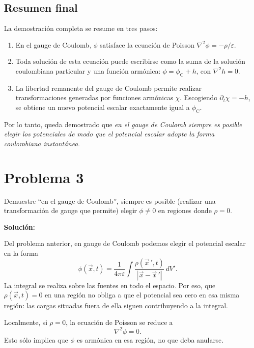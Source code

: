 \documentclass{article}
\numberwithin{equation}{section}
\newcommand{\eps}{\varepsilon}
\begin{document}
\subsection{Resumen final}

La demostración completa se resume en tres pasos:
\begin{enumerate}[leftmargin=1.5em]
    \item En el gauge de Coulomb, $\phi$ satisface la ecuación de Poisson $\nabla^2\phi=-\rho/\eps$.
    \item Toda solución de esta ecuación puede escribirse como la suma de la solución coulombiana particular y una función armónica: $\phi=\phi_{\mathrm C}+h$, con $\nabla^2h=0$.
    \item La libertad remanente del gauge de Coulomb permite realizar transformaciones generadas por funciones armónicas $\chi$. Escogiendo $\partial_t\chi=-h$, se obtiene un nuevo potencial escalar exactamente igual a $\phi_{\mathrm C}$.
\end{enumerate}

Por lo tanto, queda demostrado que \emph{en el gauge de Coulomb siempre es posible elegir los potenciales de modo que el potencial escalar adopte la forma coulombiana instantánea}.

\newpage
\section{Problema 3}
Demuestre ``en el gauge de Coulomb'', siempre es posible (realizar una transformación de gauge que permite) elegir $\phi\neq0$ en regiones donde $\rho=0$.

\textbf{Solución:}

Del problema anterior, en gauge de Coulomb podemos elegir el potencial escalar en la forma
\begin{equation}
\phi(\vec x,t)=\frac{1}{4\pi\varepsilon}
\int \frac{\rho(\vec x\,',t)}{|\vec x-\vec x\,'|}\,dV'.
\end{equation}
La integral se realiza sobre las fuentes en todo el espacio. Por eso, que $\rho(\vec x,t)=0$ en una región no obliga a que el potencial sea cero en esa misma región: las cargas situadas fuera de ella siguen contribuyendo a la integral.

Localmente, si $\rho=0$, la ecuación de Poisson se reduce a
\begin{equation}
    \nabla^2\phi=0.
\end{equation}
Esto sólo implica que $\phi$ es armónica en esa región, no que deba anularse.
\end{document}
